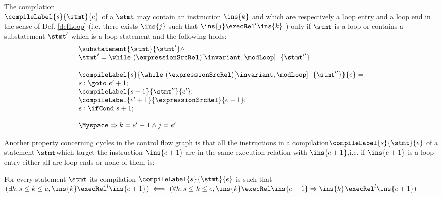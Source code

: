 \begin{compProp4}\label{compile:prop:compProp4}  %
The compilation \\ $\compileLabel{s}{\stmt}{e}$ of a $\stmt$ may contain an instruction $\ins{k}$ and   which are respectively 
a loop entry and a loop end  in the sense of Def.
\ref{defLoop} (i.e. there exists $\ins{j}$ such that $\ins{j} \execRel^{l} \ins{k}$ ) only if  $\stmt$ is a loop or contains 
 a substatement $\stmt'$ which is a loop statement and the following holds:
  $$\begin{array}{l}
                        \substatement{\stmt}{\stmt'} \wedge \\
			\stmt' = 
                       \while \ (\expressionSrcRel) \lbrack \invariant, \modLoop \rbrack \ \do \ \{ \stmt'' \} \\ \\ 

                        \compileLabel{s}{   \while \ (\expressionSrcRel) \lbrack \invariant, \modLoop \rbrack \ \do \ \{ \stmt'' \}   }{e} = \\
			s: \goto \ e' + 1; \\
	                \compileLabel{s +  1}{\stmt''}{e'}; \\
			 \compileLabel{e' +  1}{\expressionSrcRel}{e  -1 };\\
			 e: \ifCond \ s +  1; \\  \\
                        \Myspace \Rightarrow k = e' +1 \wedge j = e'  
                
	           \end{array} 
               $$ 
	   
              
             

\end{compProp4}
 
Another property concerning cycles in the control flow graph is that all the instructions in a compilation$\compileLabel{s}{\stmt}{e}$   of a statement $\stmt 
$which target the instruction $\ins{e+1}$  are in the same execution relation with  $\ins{e+1}$,i.e. if  
$\ins{e+1}$ is a  loop entry either all are loop ends or none of them is:
\begin{compProp5}\label{compile:prop:compProp5} 
 For every statement $\stmt$ its compilation $\compileLabel{s}{\stmt}{e}$ is such that 
$(\exists k, s \le k \le e, \ins{k} \execRel^{l} \ins{e+1} ) \iff (\forall k, s \le k \le e, \ins{k} \execRel \ins{e+1}  \Rightarrow \ins{k} \execRel^{l} \ins{e+1} ) $
\end{compProp5}


